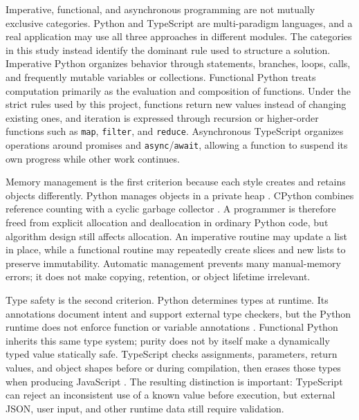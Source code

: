 \documentclass[12pt]{article}
\begin{document}
Imperative, functional, and asynchronous programming are not mutually exclusive categories. Python and TypeScript are multi-paradigm languages, and a real application may use all three approaches in different modules. The categories in this study instead identify the dominant rule used to structure a solution. Imperative Python organizes behavior through statements, branches, loops, calls, and frequently mutable variables or collections. Functional Python treats computation primarily as the evaluation and composition of functions. Under the strict rules used by this project, functions return new values instead of changing existing ones, and iteration is expressed through recursion or higher-order functions such as \texttt{map}, \texttt{filter}, and \texttt{reduce}. Asynchronous TypeScript organizes operations around promises and \texttt{async}/\texttt{await}, allowing a function to suspend its own progress while other work continues.


Memory management is the first criterion because each style creates and retains objects differently. Python manages objects in a private heap \cite{ref2}. CPython combines reference counting with a cyclic garbage collector \cite{ref3}. A programmer is therefore freed from explicit allocation and deallocation in ordinary Python code, but algorithm design still affects allocation. An imperative routine may update a list in place, while a functional routine may repeatedly create slices and new lists to preserve immutability. Automatic management prevents many manual-memory errors; it does not make copying, retention, or object lifetime irrelevant.


Type safety is the second criterion. Python determines types at runtime. Its annotations document intent and support external type checkers, but the Python runtime does not enforce function or variable annotations \cite{ref4}. Functional Python inherits this same type system; purity does not by itself make a dynamically typed value statically safe. TypeScript checks assignments, parameters, return values, and object shapes before or during compilation, then erases those types when producing JavaScript \cite{ref1}. The resulting distinction is important: TypeScript can reject an inconsistent use of a known value before execution, but external JSON, user input, and other runtime data still require validation.
\end{document}
